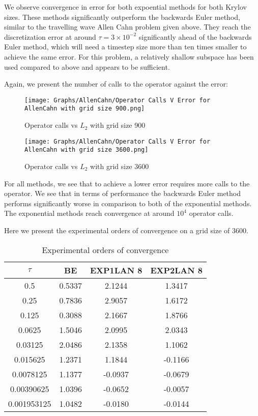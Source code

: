 We observe convergence in error for both expoential methods for both Krylov sizes.
These methods significantly outperform the backwards Euler method, similar to the travelling wave Allen Cahn problem given above.
They reach the discretization error at around $\tau=3\times10^{-2}$ significantly ahead of the backwards Euler method, which will need a timestep size more than ten times smaller to achieve the same error.
For this problem, a relatively shallow subspace has been used compared to above and appears to be sufficient.

Again, we present the number of calls to the operator against the error:
\begin{figure}[H]
    \centering
    \begin{minipage}{0.49\textwidth}
        \texttt{[image: Graphs/AllenCahn/Operator Calls V Error for AllenCahn with grid size 900.png]} %
        \caption{Operator calls vs $L_2$ with grid size 900}
        \label{fig:plot1}
    \end{minipage}\hfill
    \centering
    \begin{minipage}{0.49\textwidth}
        \texttt{[image: Graphs/AllenCahn/Operator Calls V Error for AllenCahn with grid size 3600.png]} %
        \caption{Operator calls vs $L_2$ with grid size 3600}
        \label{fig:plot2}
    \end{minipage}\hfill
\end{figure}
For all methods, we see that to achieve a lower error requires more calls to the operator.
We see that in terms of performance the backwards Euler method performs significantly worse in comparison to both of the exponential methods.
The exponential methods reach convergence at around $10^4$ operator calls.

Here we present the experimental orders of convergence on a grid size of 3600.

\begin{table}[H]
    \centering
    \begin{tabular}{| c | c | c | c |}
    \hline
    $\tau$ & BE & EXP1LAN 8 & EXP2LAN 8 \\
    \hline
    0.5 & 0.5337 & 2.1244    & 1.3417 \\
    0.25 & 0.7836 & 2.9057    & 1.6172 \\
    0.125 & 0.3088 & 2.1667   & 1.8766 \\
    0.0625 & 1.5046  & 2.0995   & 2.0343 \\
    0.03125 & 2.0486 & 2.1358     & 1.1062 \\
    0.015625 & 1.2371  & 1.1844    & -0.1166 \\
    0.0078125 & 1.1377 & -0.0937 & -0.0679 \\
    0.00390625 & 1.0396 & -0.0652 & -0.0057 \\
    0.001953125 & 1.0482 & -0.0180 & -0.0144 \\
    \hline
    \end{tabular}
    \caption{Experimental orders of convergence}
    \label{tab:reduced_data}
\end{table}

